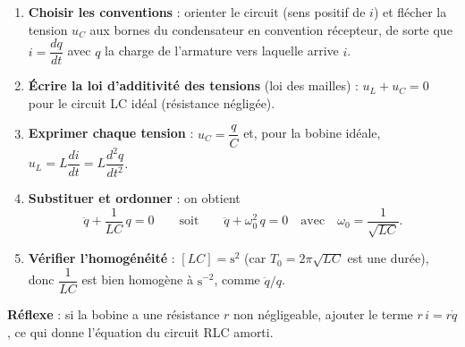 \documentclass[11pt]{article}
\newcommand{\cle}[1]{{\popxbold\color{popdark}#1}}
\begin{document}
\begin{methode}
\begin{enumerate}
\item \textbf{Choisir les conventions} : orienter le circuit (sens positif de $i$) et flécher la tension $u_C$ aux bornes du condensateur en convention \cle{récepteur}, de sorte que $i = \dfrac{dq}{dt}$ avec $q$ la charge de l'armature vers laquelle arrive $i$.
\item \textbf{Écrire la loi d'additivité des tensions} (loi des mailles) : $u_L + u_C = 0$ pour le circuit LC idéal (résistance négligée).
\item \textbf{Exprimer chaque tension} : $u_C = \dfrac{q}{C}$ et, pour la bobine idéale, $u_L = L\dfrac{di}{dt} = L\dfrac{d^2q}{dt^2}$.
\item \textbf{Substituer et ordonner} : on obtient
\[ \ddot{q} + \frac{1}{LC}\,q = 0 \qquad \text{soit} \qquad \ddot{q} + \omega_0^2\, q = 0 \quad \text{avec} \quad \omega_0 = \frac{1}{\sqrt{LC}}. \]
\item \textbf{Vérifier l'homogénéité} : $[LC] = \text{s}^2$ (car $T_0 = 2\pi\sqrt{LC}$ est une durée), donc $\dfrac{1}{LC}$ est bien homogène à $\text{s}^{-2}$, comme $\ddot{q}/q$.
\end{enumerate}
\textbf{Réflexe} : si la bobine a une résistance $r$ non négligeable, ajouter le terme $r\,i = r\dot{q}$, ce qui donne l'équation du circuit RLC amorti.
\end{methode}
\end{document}
